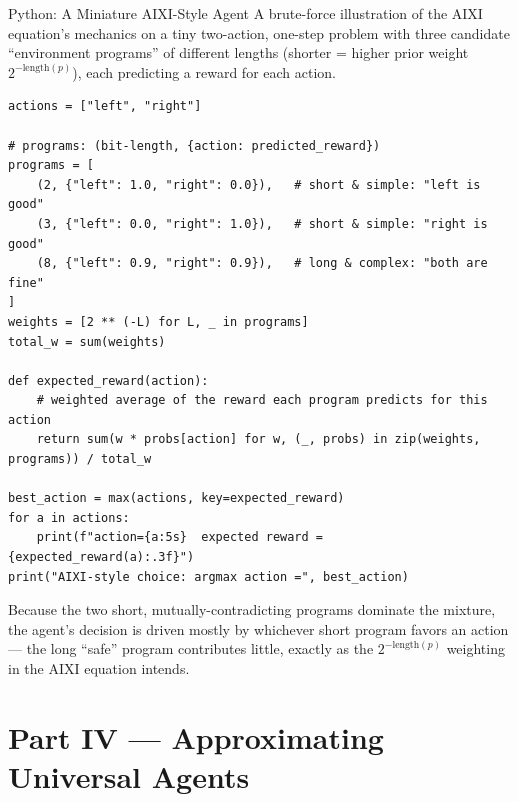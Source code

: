 \documentclass[aspectratio=169,10pt]{beamer}
\begin{document}
\begin{frame}[fragile]{Python: A Miniature AIXI-Style Agent}
  A brute-force illustration of the AIXI equation's mechanics on a tiny
  two-action, one-step problem with three candidate ``environment
  programs'' of different lengths (shorter = higher prior weight
  $2^{-\mathrm{length}(p)}$), each predicting a reward for each action.

  \begin{lstlisting}[style=pycode]
actions = ["left", "right"]

# programs: (bit-length, {action: predicted_reward})
programs = [
    (2, {"left": 1.0, "right": 0.0}),   # short & simple: "left is good"
    (3, {"left": 0.0, "right": 1.0}),   # short & simple: "right is good"
    (8, {"left": 0.9, "right": 0.9}),   # long & complex: "both are fine"
]
weights = [2 ** (-L) for L, _ in programs]
total_w = sum(weights)

def expected_reward(action):
    # weighted average of the reward each program predicts for this action
    return sum(w * probs[action] for w, (_, probs) in zip(weights, programs)) / total_w

best_action = max(actions, key=expected_reward)
for a in actions:
    print(f"action={a:5s}  expected reward = {expected_reward(a):.3f}")
print("AIXI-style choice: argmax action =", best_action)
  \end{lstlisting}
  Because the two short, mutually-contradicting programs dominate the
  mixture, the agent's decision is driven mostly by whichever short program
  favors an action --- the long ``safe'' program contributes little, exactly
  as the $2^{-\mathrm{length}(p)}$ weighting in the AIXI equation intends.
\end{frame}

\section{Part IV --- Approximating Universal Agents}
\end{document}
